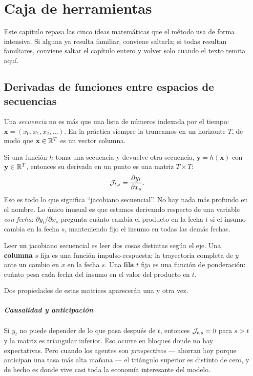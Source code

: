 \chapter{Caja de herramientas}
\label{cap:herramientas}

Este capítulo repasa las cinco ideas matemáticas que el método usa de forma
intensiva. Si alguna ya resulta familiar, conviene saltarla; si todas resultan
familiares, conviene saltar el capítulo entero y volver solo cuando el texto
remita aquí.

\section{Derivadas de funciones entre espacios de secuencias}

Una \emph{secuencia} no es más que una lista de números indexada por el tiempo:
$\mathbf{x} = (x_0, x_1, x_2, \dots)$. En la práctica siempre la truncamos en un
horizonte $T$, de modo que $\mathbf{x} \in \mathbb{R}^T$ es un vector columna.

Si una función $h$ toma una secuencia y devuelve otra secuencia,
$\mathbf{y} = h(\mathbf{x})$ con $\mathbf{y}\in\mathbb{R}^T$, entonces su derivada en un
punto es una matriz $T\times T$:
\begin{equation}
\mathcal{J}_{t,s} = \frac{\partial y_t}{\partial x_s}.
\end{equation}
Eso es todo lo que significa ``jacobiano secuencial''. No hay nada más profundo
en el nombre. Lo único inusual es que estamos derivando respecto de una variable
\emph{con fecha}: $\partial y_t/\partial x_s$ pregunta cuánto cambia el producto
en la fecha $t$ si el insumo cambia en la fecha $s$, manteniendo fijo el insumo
en todas las demás fechas.

\begin{idea}
Leer un jacobiano secuencial es leer dos cosas distintas según el eje.
Una \textbf{columna} $s$ fija es una función impulso-respuesta: la trayectoria
completa de $y$ ante un cambio en $x$ en la fecha $s$. Una \textbf{fila} $t$
fija es una función de ponderación: cuánto pesa cada fecha del insumo en el
valor del producto en $t$.
\end{idea}

Dos propiedades de estas matrices aparecerán una y otra vez.

\paragraph{Causalidad y anticipación} Si $y_t$ no puede depender de lo que pasa
después de $t$, entonces $\mathcal{J}_{t,s} = 0$ para $s > t$ y la matriz es triangular
inferior. Eso ocurre en bloques donde no hay expectativas. Pero cuando los
agentes son \emph{prospectivos} --- ahorran hoy porque anticipan una tasa más
alta mañana --- el triángulo superior es distinto de cero, y de hecho es donde
vive casi toda la economía interesante del modelo.


